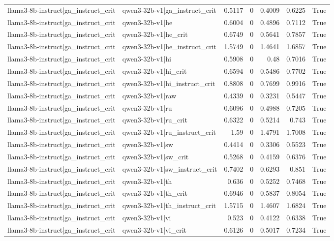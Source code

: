 \begin{table}
\begin{tabular}{l l r r r r l}
llama3-8b-instruct|ga_instruct_crit & qwen3-32b-v1|ga_instruct_crit & 0.5117 & 0 & 0.4009 & 0.6225 & True \\
llama3-8b-instruct|ga_instruct_crit & qwen3-32b-v1|he & 0.6004 & 0 & 0.4896 & 0.7112 & True \\
llama3-8b-instruct|ga_instruct_crit & qwen3-32b-v1|he_crit & 0.6749 & 0 & 0.5641 & 0.7857 & True \\
llama3-8b-instruct|ga_instruct_crit & qwen3-32b-v1|he_instruct_crit & 1.5749 & 0 & 1.4641 & 1.6857 & True \\
llama3-8b-instruct|ga_instruct_crit & qwen3-32b-v1|hi & 0.5908 & 0 & 0.48 & 0.7016 & True \\
llama3-8b-instruct|ga_instruct_crit & qwen3-32b-v1|hi_crit & 0.6594 & 0 & 0.5486 & 0.7702 & True \\
llama3-8b-instruct|ga_instruct_crit & qwen3-32b-v1|hi_instruct_crit & 0.8808 & 0 & 0.7699 & 0.9916 & True \\
llama3-8b-instruct|ga_instruct_crit & qwen3-32b-v1|raw & 0.4339 & 0 & 0.3231 & 0.5447 & True \\
llama3-8b-instruct|ga_instruct_crit & qwen3-32b-v1|ru & 0.6096 & 0 & 0.4988 & 0.7205 & True \\
llama3-8b-instruct|ga_instruct_crit & qwen3-32b-v1|ru_crit & 0.6322 & 0 & 0.5214 & 0.743 & True \\
llama3-8b-instruct|ga_instruct_crit & qwen3-32b-v1|ru_instruct_crit & 1.59 & 0 & 1.4791 & 1.7008 & True \\
llama3-8b-instruct|ga_instruct_crit & qwen3-32b-v1|sw & 0.4414 & 0 & 0.3306 & 0.5523 & True \\
llama3-8b-instruct|ga_instruct_crit & qwen3-32b-v1|sw_crit & 0.5268 & 0 & 0.4159 & 0.6376 & True \\
llama3-8b-instruct|ga_instruct_crit & qwen3-32b-v1|sw_instruct_crit & 0.7402 & 0 & 0.6293 & 0.851 & True \\
llama3-8b-instruct|ga_instruct_crit & qwen3-32b-v1|th & 0.636 & 0 & 0.5252 & 0.7468 & True \\
llama3-8b-instruct|ga_instruct_crit & qwen3-32b-v1|th_crit & 0.6946 & 0 & 0.5837 & 0.8054 & True \\
llama3-8b-instruct|ga_instruct_crit & qwen3-32b-v1|th_instruct_crit & 1.5715 & 0 & 1.4607 & 1.6824 & True \\
llama3-8b-instruct|ga_instruct_crit & qwen3-32b-v1|vi & 0.523 & 0 & 0.4122 & 0.6338 & True \\
llama3-8b-instruct|ga_instruct_crit & qwen3-32b-v1|vi_crit & 0.6126 & 0 & 0.5017 & 0.7234 & True \\

\end{tabular}
\end{table}
